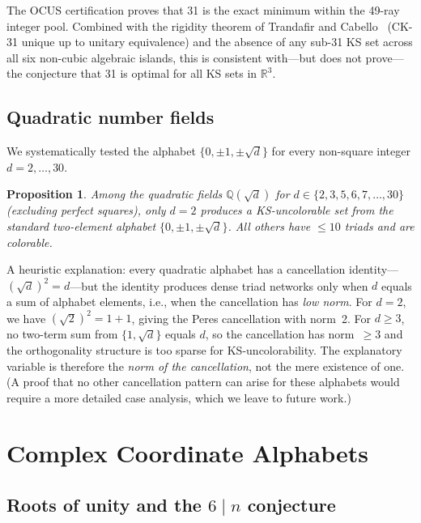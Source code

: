 \documentclass[12pt,a4paper]{article}
\newtheorem{proposition}[theorem]{Proposition}
\newcommand{\R}{\mathbb{R}}
\newcommand{\Q}{\mathbb{Q}}
\begin{document}
The OCUS certification proves that 31 is the exact minimum within the 49-ray integer pool.  Combined with the rigidity theorem of Trandafir and Cabello~\cite{TrandafirCabello2025} (CK-31 unique up to unitary equivalence) and the absence of any sub-31 KS set across all six non-cubic algebraic islands, this is consistent with---but does not prove---the conjecture that 31 is optimal for all KS sets in $\R^3$.

\subsection{Quadratic number fields}\label{sec:quadratic}

We systematically tested the alphabet $\{0, \pm 1, \pm\sqrt{d}\}$ for every non-square integer $d = 2, \ldots, 30$.

\begin{proposition}\label{prop:quadratic}
Among the quadratic fields $\Q(\sqrt{d})$ for $d \in \{2, 3, 5, 6, 7, \ldots, 30\}$ (excluding perfect squares), only $d = 2$ produces a KS-uncolorable set from the standard two-element alphabet $\{0, \pm 1, \pm\sqrt{d}\}$. All others have $\leq 10$ triads and are colorable.
\end{proposition}

A heuristic explanation: every quadratic alphabet has a cancellation identity---$(\sqrt{d})^2 = d$---but the identity produces dense triad networks only when $d$ equals a sum of alphabet elements, i.e., when the cancellation has \emph{low norm}.  For $d = 2$, we have $(\sqrt{2})^2 = 1 + 1$, giving the Peres cancellation with norm~2.  For $d \geq 3$, no two-term sum from $\{1, \sqrt{d}\}$ equals $d$, so the cancellation has norm~$\geq 3$ and the orthogonality structure is too sparse for KS-uncolorability.  The explanatory variable is therefore the \emph{norm of the cancellation}, not the mere existence of one.  (A proof that no other cancellation pattern can arise for these alphabets would require a more detailed case analysis, which we leave to future work.)

\section{Complex Coordinate Alphabets}\label{sec:complex}

\subsection{Roots of unity and the $6 \mid n$ conjecture}\label{sec:roots}
\end{document}
